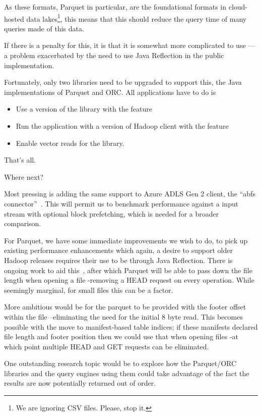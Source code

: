 \documentclass[manuscript]{acmart}
\begin{document}
As these formats, Parquet in particular, are the foundational formats in cloud-hosted
data lakes\footnote{We are ignoring CSV files. Please, stop it.},
this means that this should reduce the query time of many queries
made of this data.

If there is a penalty for this, it is that it is somewhat more
complicated to use ---a problem exacerbated by the need to use
Java Reflection in the public implementation.

Fortunately, only two libraries need to be upgraded to support this,
the Java implementations of Parquet and ORC\@.
All applications have to do is
\begin{itemize}
    \item Use a version of the library with the feature
    \item Run the application with a version of Hadoop client with the feature
    \item Enable vector reads for the library.
\end{itemize}
That's all.

Where next?

Most pressing is adding the same support to Azure ADLS Gen 2 client, the
``abfs connector''\ \cite{HADOOP-18884}.
This will permit us to benchmark performance against a
input stream with optional block prefetching,
which is needed for a broader comparison.

For Parquet, we have some immediate improvements we wish
to do, to pick up existing performance enhancements
which again, a desire to support older Hadoop releases
requires their use to be through Java Reflection.
There is ongoing work to aid this\ \cite{HADOOP-19131},
after which Parquet will be able to pass down the
file length when opening a file -removing a HEAD request
on every operation.
While seemingly marginal, for small files this can be a factor.

More ambitious would be for the parquet to be provided with the footer offset
within the file --eliminating the need for the initial 8 byte read.
This becomes possible with the move to manifest-based table indices;
if these manifests declared file length and footer position then we
could use that when opening files -at which point multiple HEAD and GET
requests can be eliminated.

One outstanding research topic would be to explore how the Parquet/ORC
libraries and the query engines using them could take advantage of
the fact the results are now potentially returned out of order.
\end{document}
